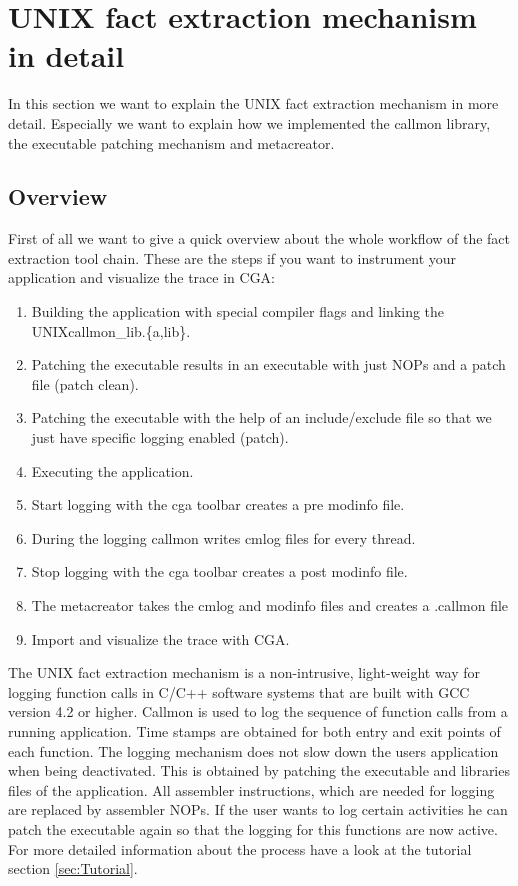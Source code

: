 
\section{UNIX fact extraction mechanism in detail}

In this section we want to explain the UNIX fact extraction mechanism in more detail. Especially we want to explain how we implemented the callmon library, the executable patching mechanism and metacreator.

\subsection{Overview}

First of all we want to give a quick overview about the whole workflow of the fact extraction tool chain. These are the steps if you want to instrument your application and visualize the trace in CGA:

\begin{enumerate}
	\item Building the application with special compiler flags and linking the UNIXcallmon\_lib.\{a,lib\}.
	\item Patching the executable results in an executable with just NOPs and a patch file (patch clean).
	\item Patching the executable with the help of an include/exclude file so that we just have specific logging enabled (patch).
	\item Executing the application.
	\item Start logging with the cga toolbar creates a pre modinfo file.
	\item During the logging callmon writes cmlog files for every thread.
	\item Stop logging with the cga toolbar creates a post modinfo file.
	\item The metacreator takes the cmlog and modinfo files and creates a .callmon file
	\item Import and visualize the trace with CGA.
\end{enumerate}

The UNIX fact extraction mechanism is a non-intrusive, light-weight way for logging function calls in C/C++ software systems that are built with GCC version 4.2 or higher. Callmon is used to log the sequence of function calls from a running application. Time stamps are obtained for both entry and exit points of each function. The logging mechanism does not slow down the users application when being deactivated. This is obtained by patching the executable and libraries files of the application. All assembler instructions, which are needed for logging are replaced by assembler NOPs. If the user wants to log certain activities he can patch the executable again so that the logging for this functions are now active. For more detailed information about the process have a look at the tutorial section \ref{sec:Tutorial}.

